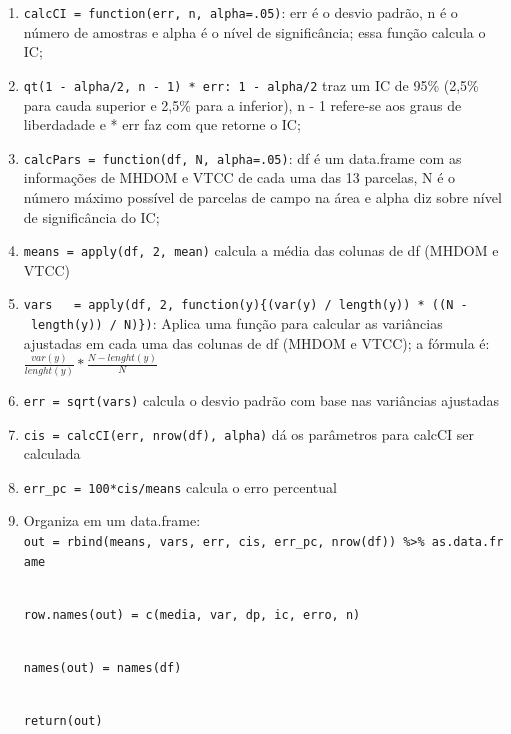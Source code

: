\documentclass[
]{article}
\begin{document}
\begin{enumerate}
\def\labelenumi{\arabic{enumi}.}
\item
  \texttt{calcCI\ =\ function(err,\ n,\ alpha=.05)}: err é o desvio
  padrão, n é o número de amostras e alpha é o nível de significância;
  essa função calcula o IC;
\item
  \texttt{qt(1\ -\ alpha/2,\ n\ -\ 1)\ *\ err:\ 1\ -\ alpha/2} traz um
  IC de 95\% (2,5\% para cauda superior e 2,5\% para a inferior), n - 1
  refere-se aos graus de liberdadade e * err faz com que retorne o IC;
\item
  \texttt{calcPars\ =\ function(df,\ N,\ alpha=.05)}: df é um data.frame
  com as informações de MHDOM e VTCC de cada uma das 13 parcelas, N é o
  número máximo possível de parcelas de campo na área e alpha diz sobre
  nível de significância do IC;
\item
  \texttt{means\ =\ apply(df,\ 2,\ mean)} calcula a média das colunas de
  df (MHDOM e VTCC)
\item
  \texttt{vars\ \ \ =\ apply(df,\ 2,\ function(y)\{(var(y)\ /\ length(y))\ *\ ((N\ -\ length(y))\ /\ N)\})}:
  Aplica uma função para calcular as variâncias ajustadas em cada uma
  das colunas de df (MHDOM e VTCC); a fórmula é:
  \(\frac {var(y)}{lenght(y)} * \frac {N - lenght(y)}{N}\)
\item
  \texttt{err\ =\ sqrt(vars)} calcula o desvio padrão com base nas
  variâncias ajustadas
\item
  \texttt{cis\ =\ calcCI(err,\ nrow(df),\ alpha)} dá os parâmetros para
  calcCI ser calculada
\item
  \texttt{err\_pc\ =\ 100*cis/means} calcula o erro percentual
\item
  Organiza em um data.frame:\\
  \texttt{out\ =\ rbind(means,\ vars,\ err,\ cis,\ err\_pc,\ nrow(df))\ \%\textgreater{}\%\ as.data.frame}\strut \\
  \texttt{row.names(out)\ =\ c(\textquotesingle{}media\textquotesingle{},\ \textquotesingle{}var\textquotesingle{},\ \textquotesingle{}dp\textquotesingle{},\ \textquotesingle{}ic\textquotesingle{},\ \textquotesingle{}erro\textquotesingle{},\ \textquotesingle{}n\textquotesingle{})}\strut \\
  \texttt{names(out)\ =\ names(df)}\strut \\
  \texttt{return(out)}
\end{enumerate}
\end{document}
